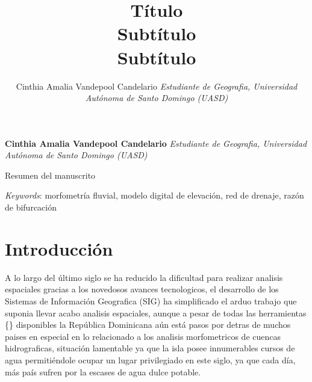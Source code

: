 \documentclass[11pt,]{article}
\title{Título\\
Subtítulo\\
Subtítulo  }
\author{\Large Cinthia Amalia Vandepool Candelario\vspace{0.05in} \newline\normalsize\emph{Estudiante de Geografia, Universidad Autónoma de Santo Domingo (UASD)}  }
\date{}
\newcommand*{\authorfont}{\fontfamily{phv}\selectfont}
\renewenvironment{abstract}
 {{%
    \setlength{\leftmargin}{0mm}
    \setlength{\rightmargin}{\leftmargin}%
  }%
  \relax}
 {\endlist}
\begin{document}
	
%

{%
\setlength{\parindent}{0pt}
\thispagestyle{plain}
{\fontsize{18}{20}\selectfont\raggedright 
\maketitle  %

}

{
   \vskip 13.5pt\relax \normalsize\fontsize{11}{12} 
\textbf{\authorfont Cinthia Amalia Vandepool Candelario} \hskip 15pt \emph{\small Estudiante de Geografia, Universidad Autónoma de Santo Domingo (UASD)}   

}

}








\begin{abstract}

    \hbox{\vrule height .2pt width 39.14pc}

    \vskip 8.5pt %

\noindent Resumen del manuscrito


\vskip 8.5pt \noindent \emph{Keywords}: morfometría fluvial, modelo digital de elevación, red de drenaje, razón
de bifurcación \par

    \hbox{\vrule height .2pt width 39.14pc}



\end{abstract}


\vskip 6.5pt


\noindent  \section{Introducción}\label{introducciuxf3n}

A lo largo del último siglo se ha reducido la dificultad para realizar
analisis espaciales gracias a los novedosos avances tecnologicos, el
desarrollo de los Sistemas de Información Geografica (SIG) ha
simplificado el arduo trabajo que suponia llevar acabo analisis
espaciales, aunque a pesar de todas las herramientas \{\} disponibles la
República Dominicana aún está pasos por detras de muchos paises en
especial en lo relacionado a los analisis morfometricos de cuencas
hidrograficas, situación lamentable ya que la isla posee innumerables
cursos de agua permitiéndole ocupar un lugar privilegiado en este siglo,
ya que cada día, más país sufren por la escases de agua dulce potable.
\end{document}
